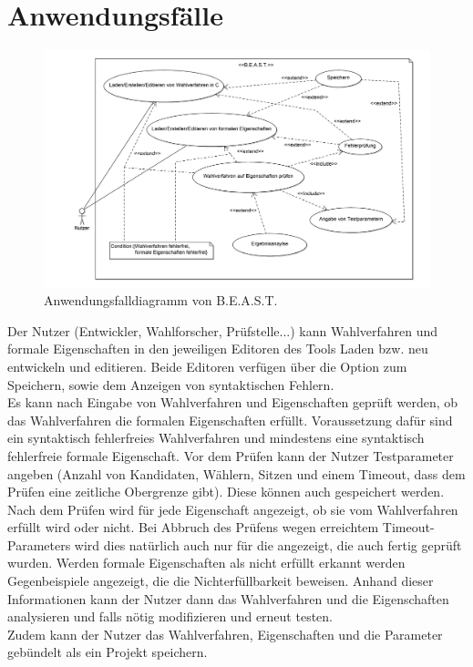 \documentclass[a4paper]{scrreprt}
\begin{document}
\section{Anwendungsfälle}

\begin{figure}[H]
\hspace{-3cm}
\includegraphics[scale=0.12]{UseCaseDiagram.png}
\caption{Anwendungsfalldiagramm von B.E.A.S.T.}
\label{Packet-scetch}
\end{figure}

Der Nutzer (Entwickler, Wahlforscher, Prüfstelle...) kann Wahlverfahren und formale Eigenschaften in den jeweiligen Editoren des Tools Laden bzw. neu entwickeln und editieren.
Beide Editoren verfügen über die Option zum Speichern, sowie dem Anzeigen von syntaktischen Fehlern.\\
Es kann nach Eingabe von Wahlverfahren und Eigenschaften geprüft werden, ob das Wahlverfahren die formalen Eigenschaften erfüllt. Voraussetzung dafür sind ein syntaktisch fehlerfreies Wahlverfahren und mindestens eine syntaktisch fehlerfreie formale Eigenschaft. Vor dem Prüfen kann der Nutzer Testparameter angeben (Anzahl von Kandidaten, Wählern, Sitzen und einem Timeout, dass dem Prüfen eine zeitliche Obergrenze gibt). Diese können auch gespeichert werden.\\
Nach dem Prüfen wird für jede Eigenschaft angezeigt, ob sie vom Wahlverfahren erfüllt wird oder nicht. Bei Abbruch des Prüfens wegen erreichtem Timeout-Parameters wird dies natürlich auch nur für die angezeigt, die auch fertig geprüft wurden. Werden formale Eigenschaften als nicht erfüllt erkannt werden Gegenbeispiele angezeigt, die die Nichterfüllbarkeit beweisen. Anhand dieser Informationen kann der Nutzer dann das Wahlverfahren und die Eigenschaften analysieren und falls nötig modifizieren und erneut testen.\\
Zudem kann der Nutzer das Wahlverfahren, Eigenschaften und die Parameter gebündelt als ein Projekt speichern.
\pagebreak
\end{document}
